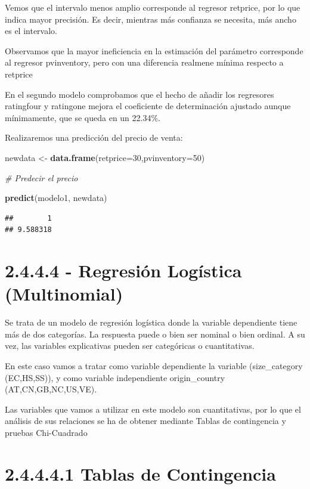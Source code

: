 \documentclass[
]{article}
\newenvironment{Shaded}{\begin{snugshade}}{\end{snugshade}}
\newcommand{\CommentTok}[1]{\textcolor[rgb]{0.56,0.35,0.01}{\textit{#1}}}
\newcommand{\DataTypeTok}[1]{\textcolor[rgb]{0.13,0.29,0.53}{#1}}
\newcommand{\DecValTok}[1]{\textcolor[rgb]{0.00,0.00,0.81}{#1}}
\newcommand{\KeywordTok}[1]{\textcolor[rgb]{0.13,0.29,0.53}{\textbf{#1}}}
\newcommand{\NormalTok}[1]{#1}
\newcommand{\StringTok}[1]{\textcolor[rgb]{0.31,0.60,0.02}{#1}}
\begin{document}
Vemos que el intervalo menos amplio corresponde al regresor retprice,
por lo que indica mayor precisión. Es decir, mientras más confianza se
necesita, más ancho es el intervalo.

Observamos que la mayor ineficiencia en la estimación del parámetro
corresponde al regresor pvinventory, pero con una diferencia realmene
mínima respecto a retprice

En el segundo modelo comprobamos que el hecho de añadir los regresores
ratingfour y ratingone mejora el coeficiente de determinación ajustado
aunque mínimamente, que se queda en un 22.34\%.

Realizaremos una predicción del precio de venta:

\begin{Shaded}
\begin{Highlighting}[]
\NormalTok{newdata <-}\StringTok{ }\KeywordTok{data.frame}\NormalTok{(}\DataTypeTok{retprice=}\DecValTok{30}\NormalTok{,}\DataTypeTok{pvinventory=}\DecValTok{50}\NormalTok{)}

\CommentTok{# Predecir el precio}

\KeywordTok{predict}\NormalTok{(modelo1, newdata)}
\end{Highlighting}
\end{Shaded}

\begin{verbatim}
##        1 
## 9.588318
\end{verbatim}

\hypertarget{regresiuxf3n-loguxedstica-multinomial}{%
\section{2.4.4.4 - Regresión Logística
(Multinomial)}\label{regresiuxf3n-loguxedstica-multinomial}}

Se trata de un modelo de regresión logística donde la variable
dependiente tiene más de dos categorías. La respuesta puede o bien ser
nominal o bien ordinal. A su vez, las variables explicativas pueden ser
categóricas o cuantitativas.

En este caso vamos a tratar como variable dependiente la variable
(size\_category (EC,HS,SS)), y como variable independiente
origin\_country (AT,CN,GB,NC,US,VE).

Las variables que vamos a utilizar en este modelo son cuantitativas, por
lo que el análisis de sus relaciones se ha de obtener mediante Tablas de
contingencia y pruebas Chi-Cuadrado

\hypertarget{tablas-de-contingencia}{%
\section{2.4.4.4.1 Tablas de
Contingencia}\label{tablas-de-contingencia}}
\end{document}
